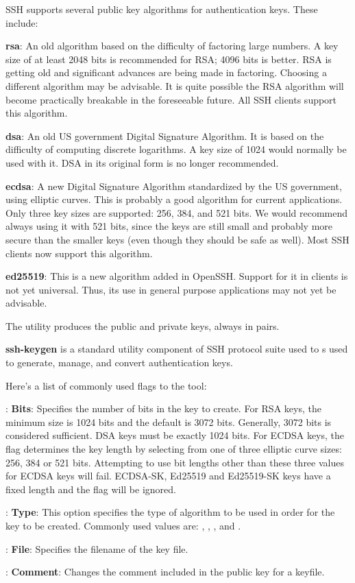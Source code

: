 SSH supports several public key algorithms for authentication keys. These include:
\bit
\item \textbf{rsa}: An old algorithm based on the difficulty of factoring large numbers. A key size of at least 2048
bits is recommended for RSA; 4096 bits is better. RSA is getting old and significant advances are being made in
factoring. Choosing a different algorithm may be advisable. It is quite possible the RSA algorithm will become
practically breakable in the foreseeable future. All SSH clients support this algorithm.
\item \textbf{dsa}: An old US government Digital Signature Algorithm. It is based on the difficulty of computing
discrete logarithms. A key size of 1024 would normally be used with it. DSA in its original form is no longer
recommended.
\item \textbf{ecdsa}: A new Digital Signature Algorithm standardized by the US government, using elliptic curves. This
is probably a good algorithm for current applications. Only three key sizes are supported: 256, 384, and 521 bits. We
would recommend always using it with 521 bits, since the keys are still small and probably more secure than the smaller
keys (even though they should be safe as well). Most SSH clients now support this algorithm.
\item \textbf{ed25519}: This is a new algorithm added in OpenSSH. Support for it in clients is not yet universal.
Thus, its use in general purpose applications may not yet be advisable.
\eit

The  utility produces the public and private keys, always in pairs.

\textbf{ssh-keygen} is a standard utility component of SSH protocol suite used to s used to generate, manage, and
convert authentication keys.
\ed

Here's a list of commonly used flags to the  tool:
\bit
\item {}: \textbf{Bits}: Specifies the number of bits in the key to create. For RSA keys, the minimum size is
1024 bits and the default is 3072 bits. Generally, 3072 bits is considered sufficient. DSA keys must be exactly 1024
bits. For ECDSA keys, the flag determines the key length by selecting from one of three elliptic curve sizes: 256,
384 or 521 bits. Attempting to use bit lengths other than these three values for ECDSA keys will fail. ECDSA-SK,
Ed25519 and Ed25519-SK keys have a fixed length and the flag will be ignored.
\item {}: \textbf{Type}: This option specifies the type of algorithm to be used in order for the key to be
created. Commonly used values are: , , , and .
\item {}: \textbf{File}: Specifies the filename of the key file.
\item {}: \textbf{Comment}: Changes the comment included in the public key for a keyfile.
\eit

